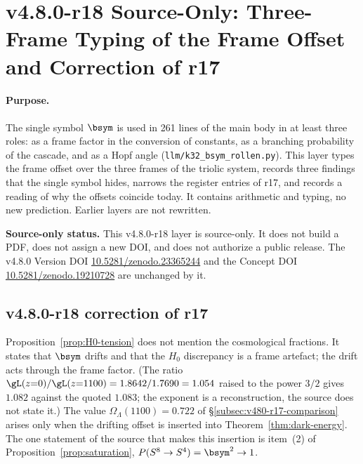 \clearpage
\section*{v4.8.0-r18 Source-Only: Three-Frame Typing of the Frame Offset and Correction of r17}
\label{sec:v480-r18-three-frame-typing}

\paragraph{Purpose.}
The single symbol \(\bsym\) is used in 261 lines of the main body in at least three roles: as a frame factor in
the conversion of constants, as a branching probability of the cascade, and as a Hopf angle
(\texttt{llm/k32\_bsym\_rollen.py}).  This layer types the frame offset over the three frames of the triolic
system, records three findings that the single symbol hides, narrows the register entries of r17, and records a
reading of why the offsets coincide today.  It contains arithmetic and typing, no new prediction.  Earlier layers
are not rewritten.

\noindent\textbf{Source-only status.}
This v4.8.0-r18 layer is source-only.  It does not build a PDF, does not assign a new DOI,
and does not authorize a public release.  The v4.8.0 Version DOI
\href{https://doi.org/10.5281/zenodo.23365244}{10.5281/zenodo.23365244} and the Concept DOI
\href{https://doi.org/10.5281/zenodo.19210728}{10.5281/zenodo.19210728} are unchanged by it.

\subsection*{v4.8.0-r18 correction of r17}
\label{subsec:v480-r18-r17-correction}

Proposition~\ref{prop:H0-tension} does not mention the cosmological fractions.  It states that \(\bsym\) drifts
and that the \(H_0\) discrepancy is a frame artefact; the drift acts through the frame factor.  (The ratio
\(\gL(z{=}0)/\gL(z{=}1100)=1.8642/1.7690=1.054\) raised to the power \(3/2\) gives \(1.082\) against the quoted
\(1.083\); the exponent is a reconstruction, the source does not state it.)  The value
\(\Omega_\Lambda(1100)=0.722\) of \S\ref{subsec:v480-r17-comparison} arises only when the drifting offset is inserted
into Theorem~\ref{thm:dark-energy}.  The one statement of the source that makes this insertion is item~(2) of
Proposition~\ref{prop:saturation}, \(P(S^8\to S^4)=\bsym^2\to1\).

